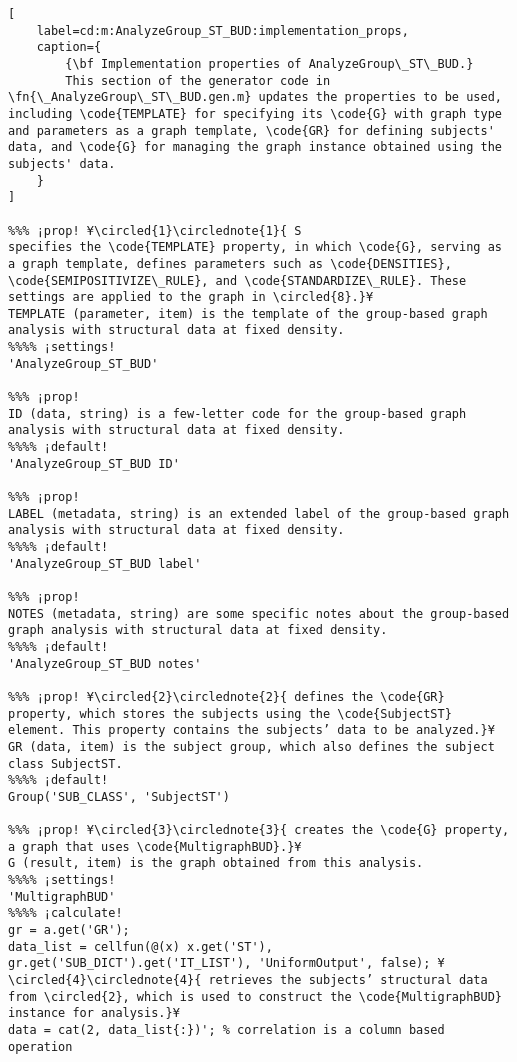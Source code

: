 \documentclass{tufte-handout}
\begin{document}
\begin{lstlisting}[
	label=cd:m:AnalyzeGroup_ST_BUD:implementation_props,
	caption={
		{\bf Implementation properties of AnalyzeGroup\_ST\_BUD.}
		This section of the generator code in \fn{\_AnalyzeGroup\_ST\_BUD.gen.m} updates the properties to be used, including \code{TEMPLATE} for specifying its \code{G} with graph type and parameters as a graph template, \code{GR} for defining subjects' data, and \code{G} for managing the graph instance obtained using the subjects' data.
	}
]

%%% ¡prop! ¥\circled{1}\circlednote{1}{ S
specifies the \code{TEMPLATE} property, in which \code{G}, serving as a graph template, defines parameters such as \code{DENSITIES}, \code{SEMIPOSITIVIZE\_RULE}, and \code{STANDARDIZE\_RULE}. These settings are applied to the graph in \circled{8}.}¥
TEMPLATE (parameter, item) is the template of the group-based graph analysis with structural data at fixed density.
%%%% ¡settings!
'AnalyzeGroup_ST_BUD'

%%% ¡prop!
ID (data, string) is a few-letter code for the group-based graph analysis with structural data at fixed density.
%%%% ¡default!
'AnalyzeGroup_ST_BUD ID'

%%% ¡prop!
LABEL (metadata, string) is an extended label of the group-based graph analysis with structural data at fixed density.
%%%% ¡default!
'AnalyzeGroup_ST_BUD label'

%%% ¡prop!
NOTES (metadata, string) are some specific notes about the group-based graph analysis with structural data at fixed density.
%%%% ¡default!
'AnalyzeGroup_ST_BUD notes'

%%% ¡prop! ¥\circled{2}\circlednote{2}{ defines the \code{GR} property, which stores the subjects using the \code{SubjectST} element. This property contains the subjects’ data to be analyzed.}¥
GR (data, item) is the subject group, which also defines the subject class SubjectST.
%%%% ¡default!
Group('SUB_CLASS', 'SubjectST')

%%% ¡prop! ¥\circled{3}\circlednote{3}{ creates the \code{G} property, a graph that uses \code{MultigraphBUD}.}¥
G (result, item) is the graph obtained from this analysis.
%%%% ¡settings!
'MultigraphBUD'
%%%% ¡calculate!
gr = a.get('GR');
data_list = cellfun(@(x) x.get('ST'), gr.get('SUB_DICT').get('IT_LIST'), 'UniformOutput', false); ¥\circled{4}\circlednote{4}{ retrieves the subjects’ structural data from \circled{2}, which is used to construct the \code{MultigraphBUD} instance for analysis.}¥
data = cat(2, data_list{:})'; % correlation is a column based operation


\end{lstlisting}
\end{document}
